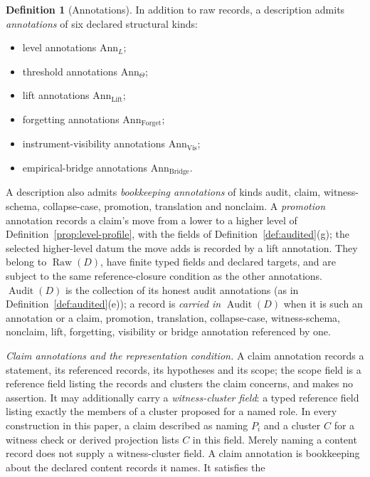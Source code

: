 \documentclass[11pt]{article}
\theoremstyle{definition}
\newtheorem{definition}[theorem]{Definition}
\newcommand{\Raw}[1]{\ensuremath{\operatorname{Raw}\!\left(#1\right)}}
\newcommand{\Audit}[1]{\ensuremath{\operatorname{Audit}\!\left(#1\right)}}
\begin{document}
\begin{definition}[Annotations]\label{def:annotations}
In addition to raw records, a description admits \emph{annotations} of six
declared structural kinds:
\begin{itemize}[topsep=2pt,itemsep=1pt]
  \item level annotations \(\mathrm{Ann}_L\);
  \item threshold annotations \(\mathrm{Ann}_\Theta\);
  \item lift annotations \(\mathrm{Ann}_{\mathrm{Lift}}\);
  \item forgetting annotations \(\mathrm{Ann}_{\mathrm{Forget}}\);
  \item instrument-visibility annotations \(\mathrm{Ann}_{\mathrm{Vis}}\);
  \item empirical-bridge annotations \(\mathrm{Ann}_{\mathrm{Bridge}}\).
\end{itemize}
A description also admits \emph{bookkeeping annotations} of kinds audit,
claim, witness-schema, collapse-case, promotion, translation and nonclaim. A
\emph{promotion} annotation records a claim's move from a lower to a higher
level of Definition~\ref{prop:level-profile}, with the fields of
Definition~\ref{def:audited}(g); the selected higher-level datum the move adds
is recorded by a lift annotation.
They belong to \(\Raw{D}\), have finite typed fields and declared targets,
and are subject to the same reference-closure condition as the other
annotations. \(\Audit{D}\) is the collection of its honest audit
annotations (as in Definition~\ref{def:audited}(e)); a record is \emph{carried in} \(\Audit{D}\) when it is such an
annotation or a claim, promotion, translation, collapse-case,
witness-schema, nonclaim, lift, forgetting, visibility or bridge annotation
referenced by one.
\par\emph{Claim annotations and the representation condition.} A claim annotation records a statement, its referenced
records, its hypotheses and its scope; the scope field is a reference field
listing the records and clusters the claim concerns, and makes no assertion. It may additionally carry a
\emph{witness-cluster field}: a typed reference field listing exactly
the members of a cluster proposed for a named role. In every
construction in this paper, a claim described as naming \(P_i\)
and a cluster \(C\) for a witness check or derived projection
lists \(C\) in this field. Merely naming a content record does
not supply a witness-cluster field. A claim annotation is bookkeeping about
the declared content records it names. It satisfies the

\end{definition}
\end{document}
